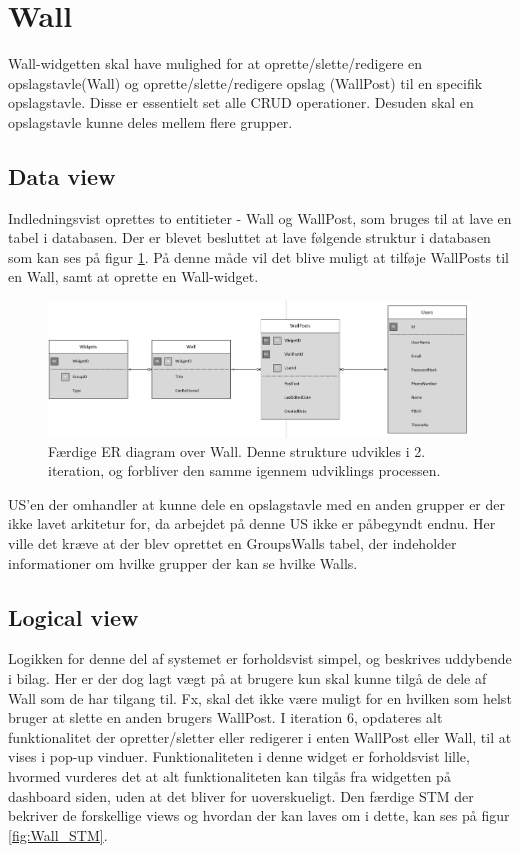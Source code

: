 \section{Wall}
Wall-widgetten skal have mulighed for at oprette/slette/redigere en opslagstavle(Wall) og oprette/slette/redigere opslag (WallPost) til en specifik opslagstavle. Disse er essentielt set alle CRUD operationer. Desuden skal en opslagstavle kunne deles mellem flere grupper.

\subsection{Data view}
Indledningsvist oprettes to entitieter - Wall og WallPost, som bruges til at lave en tabel i databasen. Der er blevet besluttet at lave følgende struktur i databasen som kan ses på figur \ref{fig:Wall_ERDiagram}. På denne måde vil det blive muligt at tilføje WallPosts til en Wall, samt at oprette en Wall-widget.

\begin{figure}[H]
  \includegraphics[width=1.0\linewidth]{01_Billeder/09_Arkitektur/Wall_DBArch.png}
  \caption{Færdige ER diagram over Wall. Denne strukture udvikles i 2. iteration, og forbliver den samme igennem udviklings processen. }
  \label{fig:Wall_ERDiagram}
\end{figure}


US'en der omhandler at kunne dele en opslagstavle med en anden grupper er der ikke lavet arkitetur for, da arbejdet på denne US ikke er påbegyndt endnu. Her ville det kræve at der blev oprettet en GroupsWalls tabel, der indeholder informationer om hvilke grupper der kan se hvilke Walls. 

\subsection{Logical view}
Logikken for denne del af systemet er forholdsvist simpel, og beskrives uddybende i bilag. Her er der dog lagt vægt på at brugere kun skal kunne tilgå de dele af Wall som de har tilgang til. Fx, skal det ikke være muligt for en hvilken som helst bruger at slette en anden brugers WallPost. I iteration 6, opdateres alt funktionalitet der opretter/sletter eller redigerer i enten WallPost eller Wall, til at vises i pop-up vinduer. Funktionaliteten i denne widget er forholdsvist lille, hvormed vurderes det at alt funktionaliteten kan tilgås fra widgetten på dashboard siden, uden at det bliver for uoverskueligt. Den færdige STM der bekriver de forskellige views og hvordan der kan laves om i dette, kan ses på figur \ref{fig:Wall_STM}.    

